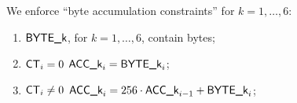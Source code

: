 We enforce ``byte accumulation constraints'' for $k=1, \dots, 6$:
\begin{enumerate}
	\item $\textsf{BYTE}\textsf{\_k}$, for $k=1, \dots, 6$, contain bytes;
	\item \If $\textsf{CT}_{i} = 0$ \Then $\textsf{ACC}\textsf{\_k}_{i} = \textsf{BYTE}\textsf{\_k}_{i}$;
	\item \If $\textsf{CT}_{i} \neq 0$ \Then $\textsf{ACC}\textsf{\_k}_{i} = 256 \cdot \textsf{ACC}\textsf{\_k}_{i - 1} + \textsf{BYTE}\textsf{\_k}_{i}$;
\end{enumerate}
